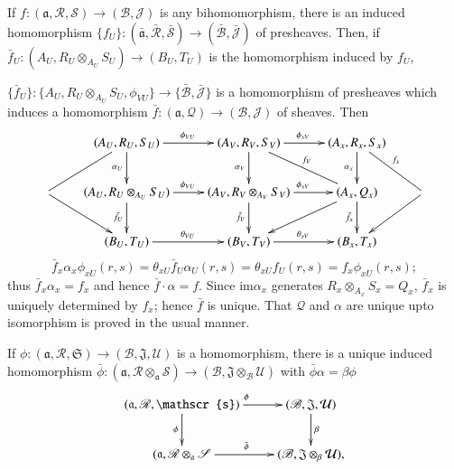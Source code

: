 If $f: (\mathfrak{a}, \mathscr{R}, \mathscr{S}) \to (\mathscr{B},
\mathscr{J})$ is 
any bihomomorphism, there is an induced homomorphism $\{f_U\}: 
(\bar{\mathfrak{a}}, \bar{\mathscr{R}}, \bar{\mathscr{S}}) \to
(\bar{\mathscr{B}}, \bar{\mathscr{J}})$ of presheaves. Then, if
$\bar{f}_U : (A_U, R_U \otimes_{A_U}S_U) \to (B_U, T_U)$ is the
homomorphism induced by $f_U$, 

$\bigg\{ \bar{f}_U \bigg \}:\bigg \{A_U, R_U \otimes_{A_U} S_U,
\phi_{VU}\bigg\} \to \bigg\{\bar{\mathscr{B}}, \bar{\mathscr{J}}
\bigg\}$ is a homomorphism of presheaves which induces a homomorphism
$\bar{f}: (\mathfrak{a}, \mathscr{Q}) \to (\mathscr{B}, \mathscr{J})$ of
sheaves. Then 
{\fontsize{10}{12}\selectfont
\[
\xymatrix{
& (A_U, R_U, S_U)\ar[r]^{\phi_{VU}} \ar[d]_{\alpha_U}
  \ar@{-}[dl] & (A_V, R_V, S_V) \ar[r]^{\phi_{xV}}
  \ar[d]_{\alpha_V} \ar@{-}[dr]^{f_V} & (A_x, R_x,
  S_x)\ar@{-}[dr]^{f_x}\ar[d]_{\alpha_x}\\
\ar[dr] & (A_U, R_U \otimes_{A_U} S_U) \ar[r]^{\phi_{VU}}
\ar[d]_{\bar{f_U}} & (A_V, R_V \otimes_{A_V} S_V) \ar[d]_{\bar{f}_V}
\ar[r]^{\phi_{xV}} & (A_x,Q_x) \ar[d]_{\bar{f}_x} \ar[dl] & \ar[dl]\\
& (B_U, T_U) \ar[r]^{\theta_{VU}} & (B_V,T_V) \ar[r]^{\theta_{xV}} &
(B_x, T_x)
}
\]}\relax\pageoriginale
$$
\bar{f}_x \alpha_x \phi_{xU}(r, s) = \theta_{xU}\bar{f}_U \alpha_U(r,
s) = \theta_{xU} f_U(r, s) = f_x \phi_{xU}(r,s) ; 
$$
thus $\bar{f}_x \alpha_x = f_x$ and hence $\bar{f} \cdot \alpha = f$. Since
im$\alpha_x$ generates $R_x \otimes_{A_x} S_x = Q_x$, $\bar{f}_x$ is
uniquely determined by $f_x$; hence $\bar{f}$ is unique. That
$\mathcal{Q}$ and $\alpha$ are unique upto isomorphism is proved in
the usual manner. 

\begin{coro*}%
If $\phi : (\mathfrak{a}, \mathscr{R}, \mathfrak{S}) \rightarrow
(\mathscr{B}, \mathfrak{J}, \mathcal{U})$ is a homomorphism, there is
a unique induced homomorphism $\bar{\phi} : (\mathfrak{a},
\mathscr{R}\otimes_{\mathfrak{a}} \mathscr{S}) \rightarrow
(\mathscr{B}, \mathfrak{J} \otimes_{\mathscr{B}}\mathcal{U}) $ with
$\bar{\phi} \alpha = \beta \phi$ 
\[
\xymatrix{
(\mathfrak{a}, \mathscr{R}, \mathscr{s}) \ar[d]_{\phi}
  \ar[r]^{\phi} & (\mathscr{B}, \mathfrak{J},
  \mathcal{U})\ar[d]^{\beta}\\
(\mathfrak{a}, \mathscr{R} \otimes_{\mathfrak{a}} \mathscr{S}
  \ar[r]^{\bar{\phi}} & (\mathscr{B}, \mathfrak{J} \otimes_{\beta}
  \mathcal{U}), 
}
\]
\end{coro*}


